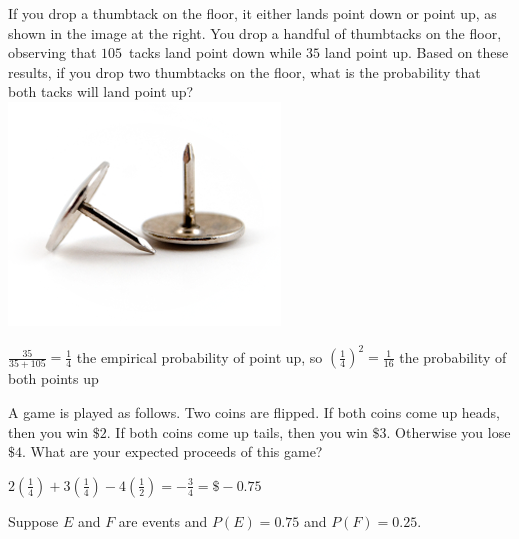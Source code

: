 \documentclass[answers,addpoints,12pt]{exam}
\begin{document}
\begin{questions}
\question[10]
\begin{multicols}{2}
If you drop a thumbtack on the floor, it either lands point down
or point up, as shown in the image at the right.
You drop a handful of thumbtacks on the floor, observing that
$105$~tacks land point down while $35$ land point up.
Based on these results, if you drop two thumbtacks on the floor, what
is the probability that both tacks will land point up?
\columnbreak\\
\includegraphics[scale=.6]{Thumbtacks}
\end{multicols}
\begin{solution}
$\frac{35}{35+105}=\frac{1}{4}$ the empirical probability
of point up, so $\left(\frac{1}{4}\right)^2=\frac{1}{16}$
the probability of both points up
\end{solution}

\question[10] A game is played as follows.
Two coins are flipped. If both coins come up
heads, then you win $\$2$. If both coins come
up tails, then you win $\$3$. 
Otherwise you lose $\$4$. What are your expected proceeds
of this game?
\begin{solution}
$2\left(\frac{1}{4}\right)+3\left(\frac{1}{4}\right)
-4\left(\frac{1}{2}\right)=-\frac{3}{4}=\$-0.75$
\end{solution}

\question[15] Suppose $E$ and $F$ are events
and $P\left(E\right)=0.75$ and $P\left(F\right)=0.25$.
\end{questions}
\end{document}

